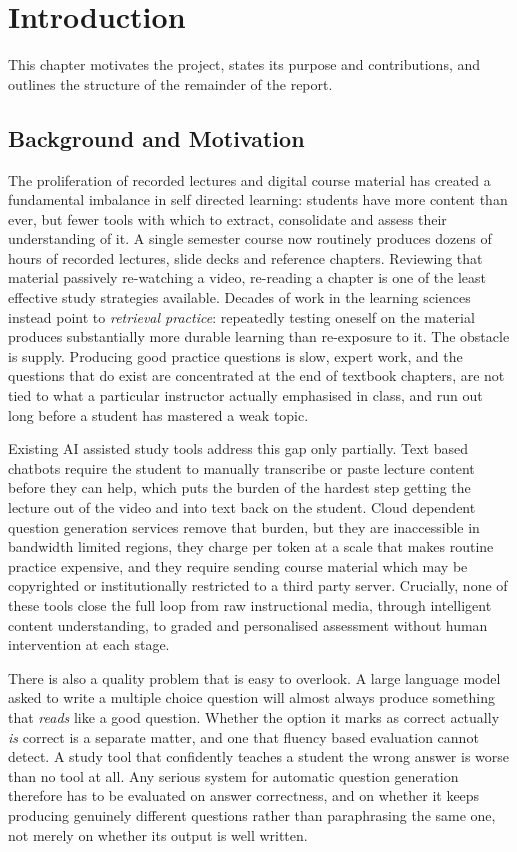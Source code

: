 \chapter{Introduction}
\label{ch:intro}

This chapter motivates the project, states its purpose and contributions, and
outlines the structure of the remainder of the report.

\section{Background and Motivation}
\label{sec:intro-motivation}

The proliferation of recorded lectures and digital course material has created a
fundamental imbalance in self directed learning: students have more content than
ever, but fewer tools with which to extract, consolidate and assess their
understanding of it. A single semester course now routinely produces dozens of
hours of recorded lectures, slide decks and reference chapters. Reviewing that
material passively  re-watching a video, re-reading a chapter is one of the
least effective study strategies available. Decades of work in the learning
sciences instead point to \emph{retrieval practice}: repeatedly testing oneself on
the material produces substantially more durable learning than re-exposure to it.
The obstacle is supply. Producing good practice questions is slow, expert work,
and the questions that do exist are concentrated at the end of textbook chapters,
are not tied to what a particular instructor actually emphasised in class, and run
out long before a student has mastered a weak topic.

Existing AI assisted study tools address this gap only partially. Text based
chatbots require the student to manually transcribe or paste lecture content before
they can help, which puts the burden of the hardest step getting the lecture out
of the video and into text back on the student. Cloud dependent question
generation services remove that burden, but they are inaccessible in
bandwidth limited regions, they charge per token at a scale that makes routine
practice expensive, and they require sending course material  which may be
copyrighted or institutionally restricted  to a third party server. Crucially,
none of these tools close the full loop from raw instructional media, through
intelligent content understanding, to graded and personalised assessment without
human intervention at each stage.

There is also a quality problem that is easy to overlook. A large language model
asked to write a multiple choice question will almost always produce something
that \emph{reads} like a good question. Whether the option it marks as correct
actually \emph{is} correct is a separate matter, and one that fluency based
evaluation cannot detect. A study tool that confidently teaches a student the wrong
answer is worse than no tool at all. Any serious system for automatic question
generation therefore has to be evaluated on answer correctness, and on whether it
keeps producing genuinely different questions rather than paraphrasing the same one,
not merely on whether its output is well written.

